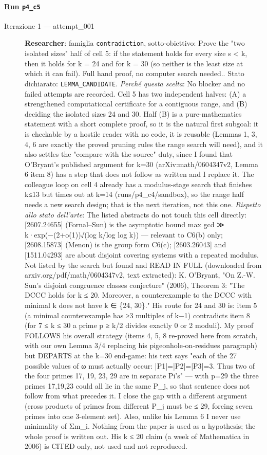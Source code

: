 \documentclass[11pt,a4paper]{article}
\begin{document}
\paragraph{Run \texttt{p4\_c5}}
\begin{description}
\item[Iterazione 1 — attempt\_001]
\textbf{Researcher}: famiglia \texttt{contradiction}, sotto-obiettivo: Prove the "two isolated sizes" half of cell 5: if the statement holds for every size s \textless{} k, then it holds for k = 24 and for k = 30 (so neither is the least size at which it can fail). Full hand proof, no computer search needed.. Stato dichiarato: \texttt{LEMMA\_CANDIDATE}.
\emph{Perché questa scelta}: No blocker and no failed attempts are recorded. Cell 5 has two independent halves: (A) a strengthened computational certificate for a contiguous range, and (B) deciding the isolated sizes 24 and 30. Half (B) is a pure-mathematics statement with a short complete proof, so it is the natural first subgoal: it is checkable by a hostile reader with no code, it is reusable (Lemmas 1, 3, 4, 6 are exactly the proved pruning rules the range search will need), and it also settles the "compare with the source" duty, since I found that O'Bryant's published argument for k=30 (arXiv:math/0604347v2, Lemma 6 item 8) has a step that does not follow as written and I replace it. The colleague loop on cell 4 already has a modulus-stage search that finishes k≤13 but times out at k=14 (runs/p4\_c4/sandbox), so the range half needs a new search design; that is the next iteration, not this one.
\emph{Rispetto allo stato dell'arte}: The listed abstracts do not touch this cell directly: [2607.24655] (Fornal–Sun) is the asymptotic bound max gcd ≫ k·exp(−(2+o(1))√(log k/log log k)) — relevant to C6(b) only; [2608.15873] (Menon) is the group form C6(c); [2603.26043] and [1511.04293] are about disjoint covering systems with a repeated modulus. Not listed by the search but found and READ IN FULL (downloaded from arxiv.org/pdf/math/0604347v2, text extracted): K. O'Bryant, "On Z.-W. Sun's disjoint congruence classes conjecture" (2006), Theorem 3: "The DCCC holds for k ≤ 20. Moreover, a counterexample to the DCCC with minimal k does not have k ∈ \{24, 30\}." His route for 24 and 30 is: item 5 (a minimal counterexample has ≥3 multiples of k−1) contradicts item 8 (for 7 ≤ k ≤ 30 a prime p ≥ k/2 divides exactly 0 or 2 moduli). My proof FOLLOWS his overall strategy (items 4, 5, 8 re-proved here from scratch, with our own Lemma 3/4 replacing his pigeonhole-on-residues paragraph) but DEPARTS at the k=30 end-game: his text says "each of the 27 possible values of ω must actually occur: |P1|=|P2|=|P3|=3. Thus two of the four primes 17, 19, 23, 29 are in separate Pi's" — with p=29 the three primes 17,19,23 could all lie in the same P\_j, so that sentence does not follow from what precedes it. I close the gap with a different argument (cross products of primes from different P\_j must be ≤ 29, forcing seven primes into one 3-element set). Also, unlike his Lemma 6 I never use minimality of Σm\_i. Nothing from the paper is used as a hypothesis; the whole proof is written out. His k ≤ 20 claim (a week of Mathematica in 2006) is CITED only, not used and not reproduced.

\end{description}
\end{document}
